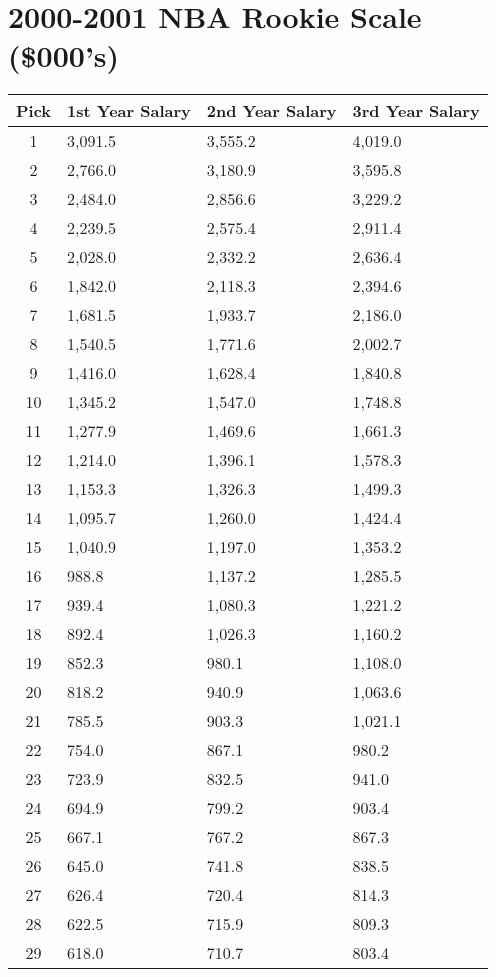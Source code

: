 \documentclass[
]{book}
\begin{document}
\newpage

\hypertarget{nba-rookie-scale-000s-3}{%
\section{2000-2001 NBA Rookie Scale (\$000's)}\label{nba-rookie-scale-000s-3}}

\begin{longtable}[]{@{}clll@{}}
\toprule()
Pick & 1st Year Salary & 2nd Year Salary & 3rd Year Salary \\
\midrule()
\endhead
1 & 3,091.5 & 3,555.2 & 4,019.0 \\
2 & 2,766.0 & 3,180.9 & 3,595.8 \\
3 & 2,484.0 & 2,856.6 & 3,229.2 \\
4 & 2,239.5 & 2,575.4 & 2,911.4 \\
5 & 2,028.0 & 2,332.2 & 2,636.4 \\
6 & 1,842.0 & 2,118.3 & 2,394.6 \\
7 & 1,681.5 & 1,933.7 & 2,186.0 \\
8 & 1,540.5 & 1,771.6 & 2,002.7 \\
9 & 1,416.0 & 1,628.4 & 1,840.8 \\
10 & 1,345.2 & 1,547.0 & 1,748.8 \\
11 & 1,277.9 & 1,469.6 & 1,661.3 \\
12 & 1,214.0 & 1,396.1 & 1,578.3 \\
13 & 1,153.3 & 1,326.3 & 1,499.3 \\
14 & 1,095.7 & 1,260.0 & 1,424.4 \\
15 & 1,040.9 & 1,197.0 & 1,353.2 \\
16 & 988.8 & 1,137.2 & 1,285.5 \\
17 & 939.4 & 1,080.3 & 1,221.2 \\
18 & 892.4 & 1,026.3 & 1,160.2 \\
19 & 852.3 & 980.1 & 1,108.0 \\
20 & 818.2 & 940.9 & 1,063.6 \\
21 & 785.5 & 903.3 & 1,021.1 \\
22 & 754.0 & 867.1 & 980.2 \\
23 & 723.9 & 832.5 & 941.0 \\
24 & 694.9 & 799.2 & 903.4 \\
25 & 667.1 & 767.2 & 867.3 \\
26 & 645.0 & 741.8 & 838.5 \\
27 & 626.4 & 720.4 & 814.3 \\
28 & 622.5 & 715.9 & 809.3 \\
29 & 618.0 & 710.7 & 803.4 \\
\bottomrule()
\end{longtable}
\end{document}
